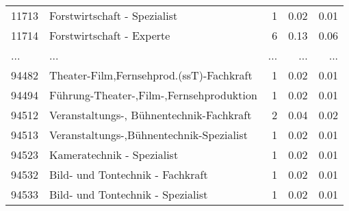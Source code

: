 \begin{longtable}{lXrrr}
        11713 & \multicolumn{1}{X}{Forstwirtschaft - Spezialist} & %
          \num{1} &
          \num[round-mode=places,round-precision=2]{0,02} &
          \num[round-mode=places,round-precision=2]{0,01} \\
        11714 & \multicolumn{1}{X}{Forstwirtschaft - Experte} & %
          \num{6} &
          \num[round-mode=places,round-precision=2]{0,13} &
          \num[round-mode=places,round-precision=2]{0,06} \\
       ... & ... & ... & ... & ... \\
        94482 & \multicolumn{1}{X}{Theater-Film,Fernsehprod.(ssT)-Fachkraft} & %
          \num{1} &
          \num[round-mode=places,round-precision=2]{0,02} &
          \num[round-mode=places,round-precision=2]{0,01} \\

        94494 & \multicolumn{1}{X}{Führung-Theater-,Film-,Fernsehproduktion} & %
          \num{1} &
          \num[round-mode=places,round-precision=2]{0,02} &
          \num[round-mode=places,round-precision=2]{0,01} \\

        94512 & \multicolumn{1}{X}{Veranstaltungs-, Bühnentechnik-Fachkraft} & %
          \num{2} &
          \num[round-mode=places,round-precision=2]{0,04} &
          \num[round-mode=places,round-precision=2]{0,02} \\

        94513 & \multicolumn{1}{X}{Veranstaltungs-,Bühnentechnik-Spezialist} & %
          \num{1} &
          \num[round-mode=places,round-precision=2]{0,02} &
          \num[round-mode=places,round-precision=2]{0,01} \\

        94523 & \multicolumn{1}{X}{Kameratechnik - Spezialist} & %
          \num{1} &
          \num[round-mode=places,round-precision=2]{0,02} &
          \num[round-mode=places,round-precision=2]{0,01} \\

        94532 & \multicolumn{1}{X}{Bild- und Tontechnik - Fachkraft} & %
          \num{1} &
          \num[round-mode=places,round-precision=2]{0,02} &
          \num[round-mode=places,round-precision=2]{0,01} \\

        94533 & \multicolumn{1}{X}{Bild- und Tontechnik - Spezialist} & %
          \num{1} &
          \num[round-mode=places,round-precision=2]{0,02} &
          \num[round-mode=places,round-precision=2]{0,01} \\


\end{longtable}
